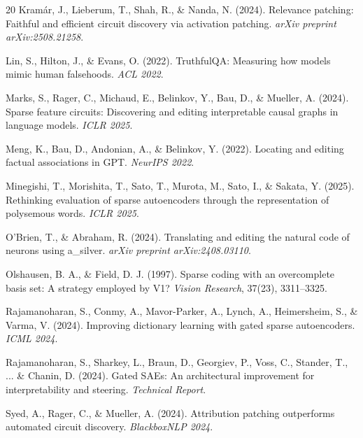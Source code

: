 \documentclass{article}
\begin{document}
\begin{thebibliography}{20}
Kram{\'a}r, J., Lieberum, T., Shah, R., \& Nanda, N. (2024).
\newblock Relevance patching: Faithful and efficient circuit discovery via activation patching.
\newblock \emph{arXiv preprint arXiv:2508.21258}.

Lin, S., Hilton, J., \& Evans, O. (2022).
\newblock TruthfulQA: Measuring how models mimic human falsehoods.
\newblock \emph{ACL 2022}.

Marks, S., Rager, C., Michaud, E., Belinkov, Y., Bau, D., \& Mueller, A. (2024).
\newblock Sparse feature circuits: Discovering and editing interpretable causal graphs in language models.
\newblock \emph{ICLR 2025}.

Meng, K., Bau, D., Andonian, A., \& Belinkov, Y. (2022).
\newblock Locating and editing factual associations in GPT.
\newblock \emph{NeurIPS 2022}.

Minegishi, T., Morishita, T., Sato, T., Murota, M., Sato, I., \& Sakata, Y. (2025).
\newblock Rethinking evaluation of sparse autoencoders through the representation of polysemous words.
\newblock \emph{ICLR 2025}.

O'Brien, T., \& Abraham, R. (2024).
\newblock Translating and editing the natural code of neurons using a\_silver.
\newblock \emph{arXiv preprint arXiv:2408.03110}.

Olshausen, B. A., \& Field, D. J. (1997).
\newblock Sparse coding with an overcomplete basis set: A strategy employed by V1?
\newblock \emph{Vision Research}, 37(23), 3311--3325.

Rajamanoharan, S., Conmy, A., Mavor-Parker, A., Lynch, A., Heimersheim, S., \& Varma, V. (2024).
\newblock Improving dictionary learning with gated sparse autoencoders.
\newblock \emph{ICML 2024}.

Rajamanoharan, S., Sharkey, L., Braun, D., Georgiev, P., Voss, C., Stander, T., ... \& Chanin, D. (2024).
\newblock Gated SAEs: An architectural improvement for interpretability and steering.
\newblock \emph{Technical Report}.

Syed, A., Rager, C., \& Mueller, A. (2024).
\newblock Attribution patching outperforms automated circuit discovery.
\newblock \emph{BlackboxNLP 2024}.


\end{thebibliography}
\end{document}
